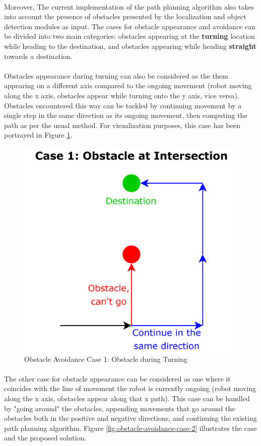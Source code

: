 \paragraph*{}
Moreover, The current implementation of the path planning algorithm also takes into account the presence of obstacles presented by the localization and object detection modules as input. The cases for obstacle appearance and avoidance can be divided into two main categories: obstacles appearing at the \textbf{turning} location while heading to the destination, and obstacles appearing while heading \textbf{straight} towards a destination.

\paragraph*{}
Obstacles appearance during turning can also be considered as the them appearing on a different axis compared to the ongoing movement (robot moving along the x axis, obstacles appear while turning onto the y axis, vice versa). Obstacles encountered this way can be tackled by continuing movement by a single step in the same direction as its ongoing movement, then computing the path as per the usual method. For visualization purposes, this case has been portrayed in Figure \ref{fig:obstacle-avoidance-case-1}.

\begin{figure} [H]
    \centering
    \includegraphics[width=0.55\linewidth]{assets/images/formation/obstacle-avoidance-case1.png}
    \caption{Obstacle Avoidance Case 1: Obstacle during Turning}
    \label{fig:obstacle-avoidance-case-1}
\end{figure}

\paragraph*{}
The other case for obstacle appearance can be considered as one where it coincides with the line of movement the robot is currently ongoing (robot moving along the x axis, obstacles appear along that x path). This case can be handled by "going around" the obstacles, appending movements that go around the obstacles both in the positive and negative directions, and continuing the existing path planning algorithm. Figure \ref{fig:obstacle-avoidance-case-2} illustrates the case and the proposed solution.


